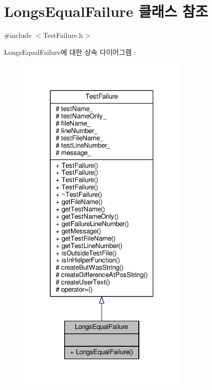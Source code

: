 \hypertarget{class_longs_equal_failure}{}\section{Longs\+Equal\+Failure 클래스 참조}
\label{class_longs_equal_failure}


{\ttfamily \#include $<$Test\+Failure.\+h$>$}



Longs\+Equal\+Failure에 대한 상속 다이어그램 \+: 
\nopagebreak
\begin{figure}[H]
\begin{center}
\leavevmode
\includegraphics[width=235pt]{class_longs_equal_failure__inherit__graph}
\end{center}
\end{figure}


